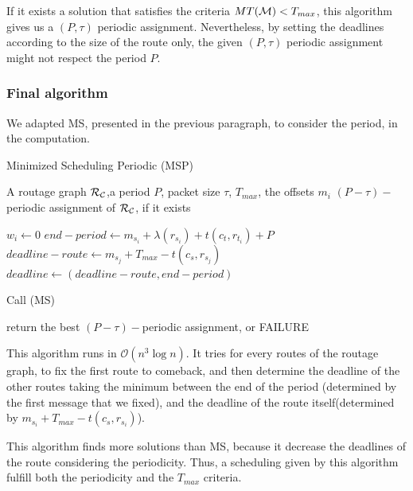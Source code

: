 \documentclass[a4paper,10pt]{article}
\begin{document}
     If it exists a solution that satisfies the criteria $MT({\cal M}) < T_{max}$, this algorithm gives us a $(P,\tau)$ periodic assignment. Nevertheless, by setting the deadlines according to the size of the route only, the given $(P,\tau)$ periodic assignment might not respect the period $P$. 
     
     \subsubsection{Final algorithm}
     
     We adapted MS, presented in the previous paragraph, to consider the period, in the computation.
     
     
          
   
     
    \begin{algorithm}[H]
    \caption{ Minimized Scheduling Periodic (MSP)}
    \begin{algorithmic}
    \REQUIRE A routage graph ${\cal R_{\cal C}}$,a period $P$, packet size $\tau$, $ T_{max}$, the offsets $m_i$
    \ENSURE $(P-\tau)-$periodic assignment of ${\cal R_{\cal C}}$, if it exists
  
    \STATE  $w_i \leftarrow 0$
    \STATE $end-period \leftarrow m_{s_i} + \lambda(r_{s_i}) + t(c_t,r_{t_i}) + P$
    \STATE $deadline-route \leftarrow m_{s_j} + T_{max}-t(c_s,r_{s_j})$
    \STATE $deadline \leftarrow (deadline-route,end-period)$
    \ENDFOR
    
    \STATE Call (MS)

    
    \ENDFOR

    \STATE return the best $(P-\tau)-$periodic assignment, or FAILURE

    \end{algorithmic}
    \end{algorithm}
    
    This algorithm runs in $\mathcal{O}(n^3\log{}n)$. It tries for every routes of the routage graph, to fix the first route to comeback, and then determine the deadline of the other routes taking the minimum between the end of the period (determined by the first message that we fixed), and the deadline of the route itself(determined by $m_{s_i} + T_{max}-t(c_s,r_{s_i})$). 
    
    This algorithm finds more solutions than MS, because it decrease the deadlines of the route considering the periodicity. Thus, a scheduling given by this algorithm fulfill both the periodicity and the $T_{max}$ criteria. 
    
\end{document}
